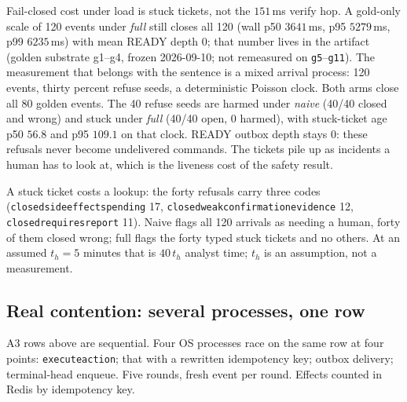 \documentclass[acmsmall,manuscript,review,anonymous]{acmart}
\renewcommand{\_}{\discretionary{\textunderscore}{}{\textunderscore}}
\begin{document}
Fail-closed cost under load is stuck tickets, not the $151$\,ms verify hop.
A gold-only scale of 120 events under \emph{full} still closes all 120
(wall p50 $3641$\,ms, p95 $5279$\,ms, p99 $6235$\,ms) with mean {READY}
depth $0$; that number lives in the artifact (golden substrate g1--g4,
frozen 2026-09-10; not remeasured on \texttt{g5}--\texttt{g11}). The measurement that belongs
with the sentence is a mixed arrival process: 120 events, thirty percent
refuse seeds, a deterministic {Poisson} clock. Both arms close all 80
golden events. The 40 refuse seeds are harmed under \emph{naive} (40/40
closed and wrong) and stuck under \emph{full} (40/40 open, 0 harmed), with
stuck-ticket age p50 $56.8$ and p95 $109.1$ on that clock. {READY} outbox
depth stays 0: these refusals never become undelivered commands. The
tickets pile up as incidents a human has to look at, which is the liveness
cost of the safety result.

A stuck ticket costs a lookup: the forty refusals carry three codes
(\texttt{closed\_side\_effects\_pending} 17,
\texttt{closed\_weak\_confirmation\_evidence} 12,
\texttt{closed\_requires\_report} 11). Naive flags all 120 arrivals as
needing a human, forty of them closed wrong; full flags the
forty typed stuck tickets and no others. At an assumed $t_h{=}5$ minutes that is
$40\,t_h$ analyst time; $t_h$ is an assumption, not a measurement.

\subsection{Real contention: several processes, one row}
\label{sec:eval-concurrency}

A3 rows above are sequential. Four OS processes race on the same row at
four points: \texttt{execute\_action}; that with a rewritten
idempotency key; outbox delivery; terminal-head enqueue. Five rounds,
fresh event per round. Effects counted in Redis by idempotency key.
\end{document}

